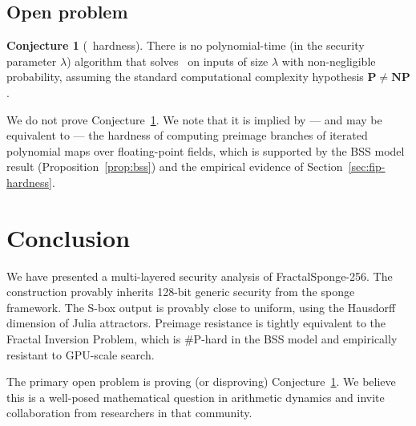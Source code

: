 \documentclass[11pt]{article}
\theoremstyle{definition}
\newtheorem{conjecture}[theorem]{Conjecture}
\theoremstyle{remark}
\newcommand{\FIP}{\mathsf{FIP}}       %
\begin{document}
\subsection{Open problem}

\begin{conjecture}[\FIP\ hardness]
\label{conj:fip}
There is no polynomial-time (in the security parameter $\lambda$) algorithm
that solves \FIP\ on inputs of size $\lambda$ with non-negligible probability,
assuming the standard computational complexity hypothesis $\mathbf{P} \neq \mathbf{NP}$.
\end{conjecture}

We do not prove Conjecture~\ref{conj:fip}. We note that it is implied by ---
and may be equivalent to --- the hardness of computing preimage branches of
iterated polynomial maps over floating-point fields, which is supported by
the BSS model result (Proposition~\ref{prop:bss}) and the empirical evidence
of Section~\ref{sec:fip-hardness}.

\section{Conclusion}

We have presented a multi-layered security analysis of FractalSponge-256.
The construction provably inherits 128-bit generic security from the sponge
framework. The S-box output is provably close to uniform, using the Hausdorff
dimension of Julia attractors. Preimage resistance is tightly equivalent to the
Fractal Inversion Problem, which is \#P-hard in the BSS model and empirically
resistant to GPU-scale search.

The primary open problem is proving (or disproving) Conjecture~\ref{conj:fip}.
We believe this is a well-posed mathematical question in arithmetic dynamics
and invite collaboration from researchers in that community.
\end{document}
